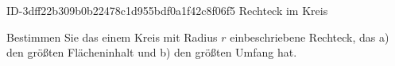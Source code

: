 \begin{exercise}
      {ID-3dff22b309b0b22478c1d955bdf0a1f42c8f06f5}
      {Rechteck im Kreis}
  \ifproblem\problem\par
    Bestimmen Sie das einem Kreis mit Radius $r$ einbeschriebene Rechteck,
    das \quad a) den größten Flächeninhalt und \quad b) den größten Umfang hat.
  \fi
\end{exercise}
